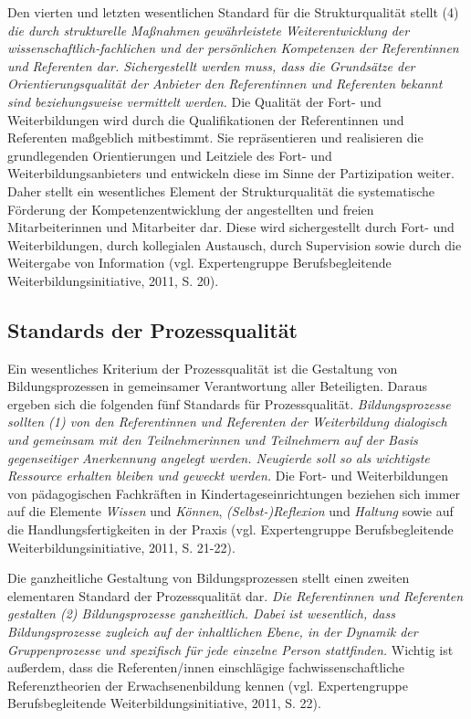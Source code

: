 \documentclass[12pt,a4paper]{article}
\begin{document}
Den vierten und letzten wesentlichen Standard für die Strukturqualität stellt (4) \textit{die durch strukturelle Maßnahmen gewährleistete Weiterentwicklung der wis\-sen\-schaft\-lich-fach\-lich\-en und der persönlichen Kompetenzen der Referentinnen und Referenten dar. Sichergestellt werden muss, dass die Grund\-sät\-ze der Orientierungsqualität der Anbieter den Referentinnen und Referenten bekannt sind beziehungsweise vermittelt werden.} Die Qualität der Fort- und Weiterbildungen wird durch die Qualifikationen der Referentinnen und Referenten maßgeblich mitbestimmt. Sie repräsentieren und realisieren die grundlegenden Orientierungen und Leitziele des Fort- und Weiterbildungsanbieters und entwickeln diese im Sinne der Partizipation weiter. Daher stellt ein wesentliches Element der Strukturqualität die systematische Förderung der Kompetenzentwicklung der angestellten und freien Mitarbeiterinnen und Mitarbeiter dar. Diese wird sichergestellt durch Fort- und Weiterbildungen, durch kollegialen Austausch, durch Supervision sowie durch die Weitergabe von Information (vgl. Expertengruppe Berufsbegleitende Weiterbildungsinitiative, 2011, S. 20).

 \subsection{Standards der Prozessqualität}

Ein wesentliches Kriterium der Prozessqualität ist die Gestaltung von Bildungsprozessen in gemeinsamer Verantwortung aller Beteiligten. Daraus er\-ge\-ben sich die folgenden fünf Standards für Prozessqualität. 
\textit{Bildungsprozesse sollten (1) von den Referentinnen und Referenten der Weiterbildung dialogisch und gemeinsam mit den Teilnehmerinnen und Teilnehmern auf der Basis gegenseitiger Anerkennung angelegt werden. Neugierde soll so als wichtigste Ressource erhalten bleiben und geweckt werden.} Die Fort- und Weiterbildungen von pädagogischen Fachkräften in Kindertageseinrichtungen beziehen sich immer auf die Elemente \textit{Wissen }und\textit{ Können}, \textit{(Selbst-)Reflexion} und \textit{Haltung} sowie auf die Handlungsfertigkeiten in der Praxis (vgl. Expertengruppe Berufsbegleitende Weiterbildungsinitiative, 2011, S. 21-22). 

Die ganz\-heit\-liche Gestaltung von Bildungsprozessen stellt einen zweiten elementaren Standard der Prozessqualität dar. \textit{Die Referentinnen und Referenten gestalten (2) Bildungsprozesse ganzheitlich. Dabei ist wesentlich, dass Bil\-dungs\-pro\-zes\-se zugleich auf der inhaltlichen Ebene, in der Dynamik der Gruppenprozesse und spezifisch für jede einzelne Person stattfinden.} Wichtig ist außerdem, dass die Referenten/innen einschlägige fachwissenschaftliche Referenztheorien der Erwachsenenbildung kennen (vgl. Expertengruppe Berufsbegleitende Weiterbildungsinitiative, 2011, S. 22). 
\end{document}
